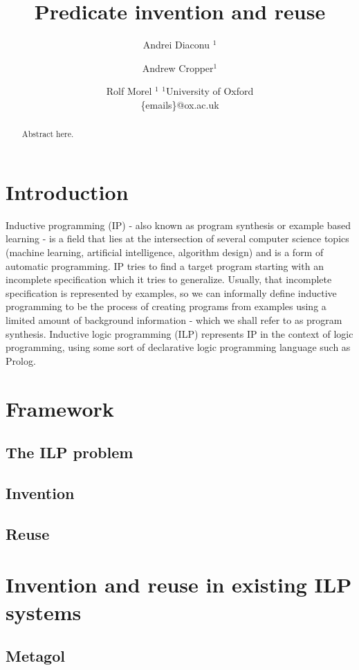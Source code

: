 \documentclass{article}
\title{Predicate invention and reuse}
\author{
Andrei Diaconu $^1$
\and
Andrew Cropper$^1$\and
Rolf Morel $^1$
\affiliations
$^1$University of Oxford\\
\emails
\{emails\}@ox.ac.uk}
\begin{document}
\maketitle




\begin{abstract}
Abstract here.
\end{abstract}

\section{Introduction}
Inductive programming (IP) \cite{indprogmeets} - also known as program synthesis or example based learning - is a field that lies at the intersection of several computer science topics (machine learning, artificial intelligence, algorithm design) and is a form of automatic programming. IP tries to find a target program starting with an incomplete specification which it tries to generalize. Usually, that incomplete specification is represented by examples, so we can informally define inductive programming to be the process of creating programs from examples using a limited amount of background information - which we shall refer to as program synthesis. Inductive logic programming (ILP) represents IP in the context of logic programming, using some sort of declarative logic programming language such as Prolog. 

\section{Framework}
\subsection{The ILP problem}
\subsection{Invention}
\subsection{Reuse}

\section{Invention and reuse in existing ILP systems}
\subsection{Metagol}
\end{document}
